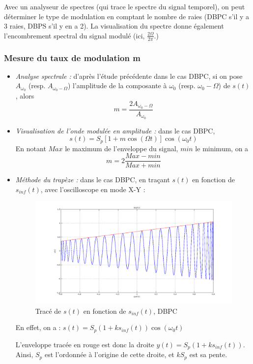 \documentclass[../../Cours_M1.tex]{subfiles}
\begin{document}
Avec un analyseur de spectres (qui trace le spectre du signal temporel), on peut déterminer le type de modulation en comptant le nombre de raies (DBPC s'il y a 3 raies, DBPS s'il y en a 2). La visualisation du spectre donne également l'encombrement spectral du signal modulé (ici, $\frac{2\Omega}{2\pi}$.)

\subsubsection{Mesure du taux de modulation m}

\begin{itemize}
\item \emph{Analyse spectrale :} d'après l'étude précédente dans le cas DBPC, si on pose $A_{\omega_0}$ (resp. $A_{\omega_0-\Omega}$) l'amplitude de la composante à $\omega_0$ (resp. $\omega_0-\Omega$) de $s(t)$, alors \[m=\frac{2A_{\omega_0-\Omega}}{A_{\omega_0}}\]

\item \emph{Visualisation de l'onde modulée en amplitude :} dans le cas DBPC, \[s(t) = S_p[1+m\cos(\Omega t)]\cos(\omega_0 t)\]
En notant $Max$ le maximum de l'enveloppe du signal, $min$ le minimum, on a
\[m= 2\frac{Max-min}{Max+min}\]

\item \emph{Méthode du trapèze :} dans le cas DBPC, en traçant $s(t)$ en fonction de $s_{inf}(t)$, avec l'oscilloscope en mode X-Y :
\begin{figure}[h!]
\centering
\includegraphics[scale=0.4]{DBPCXY.png}
\caption{Tracé de $s(t)$ en fonction de $s_{inf}(t)$, DBPC}
\end{figure}
En effet, on a : $s(t) = S_p(1+ks_{inf}(t))\cos(\omega_0 t)$

L'enveloppe tracée en rouge est donc la droite $y(t)=S_p(1+ks_{inf}(t))$. Ainsi, $S_p$ est l'ordonnée à l'origine de cette droite, et $kS_p$ est sa pente. 


\end{itemize}
\end{document}
